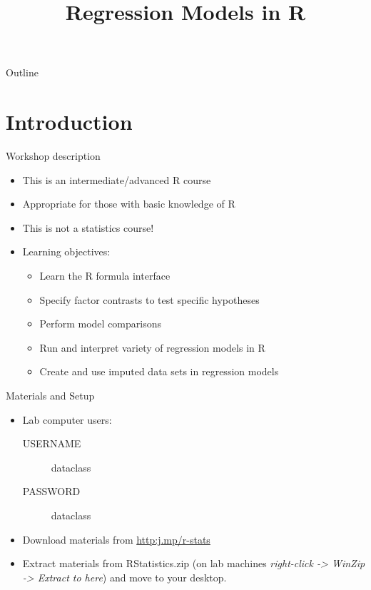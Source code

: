 \documentclass[table,smaller]{beamer}
\author{}
\date{}
\title{Regression Models in R}
\begin{document}
\maketitle
\begin{frame}{Outline}
\tableofcontents
\end{frame}



\section{Introduction}
\label{sec-1}

\begin{frame}[label=sec-1-1]{Workshop description}
\begin{itemize}
\item This is an intermediate/advanced R course
\item Appropriate for those with basic knowledge of R
\item This is not a statistics course!
\item Learning objectives:
\begin{itemize}
\item Learn the R formula interface
\item Specify factor contrasts to test specific hypotheses
\item Perform model comparisons
\item Run and interpret variety of regression models in R
\item Create and use imputed data sets in regression models
\end{itemize}
\end{itemize}
\end{frame}

\begin{frame}[label=sec-1-2]{Materials and Setup}
\begin{itemize}
\item Lab computer users:
\begin{description}
\item[{USERNAME}] dataclass
\item[{PASSWORD}] dataclass
\end{description}
\item Download materials from \url{http:j.mp/r-stats}
\item Extract materials from RStatistics.zip (on lab machines \emph{right-click -> WinZip -> Extract to here}) and move to your desktop.
\end{itemize}
\end{frame}
\end{document}
